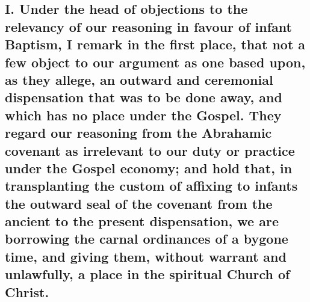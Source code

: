 \documentclass[]{book}
\begin{document}
\hypertarget{i.-under-the-head-of-objections-to-the-relevancy-of-our-reasoning-in-favour-of-infant-baptism-i-remark-in-the-first-place-that-not-a-few-object-to-our-argument-as-one-based-upon-as-they-allege-an-outward-and-ceremonial-dispensation-that-was-to-be-done-away-and-which-has-no-place-under-the-gospel.-they-regard-our-reasoning-from-the-abrahamic-covenant-as-irrelevant-to-our-duty-or-practice-under-the-gospel-economy-and-hold-that-in-transplanting-the-custom-of-affixing-to-infants-the-outward-seal-of-the-covenant-from-the-ancient-to-the-present-dispensation-we-are-borrowing-the-carnal-ordinances-of-a-bygone-time-and-giving-them-without-warrant-and-unlawfully-a-place-in-the-spiritual-church-of-christ.}{%
\subsection{I. Under the head of objections to the relevancy of our reasoning in favour of infant Baptism, I remark in the first place, that not a few object to our argument as one based upon, as they allege, an outward and ceremonial dispensation that was to be done away, and which has no place under the Gospel. They regard our reasoning from the Abrahamic covenant as irrelevant to our duty or practice under the Gospel economy; and hold that, in transplanting the custom of affixing to infants the outward seal of the covenant from the ancient to the present dispensation, we are borrowing the carnal ordinances of a bygone time, and giving them, without warrant and unlawfully, a place in the spiritual Church of Christ.}\label{i.-under-the-head-of-objections-to-the-relevancy-of-our-reasoning-in-favour-of-infant-baptism-i-remark-in-the-first-place-that-not-a-few-object-to-our-argument-as-one-based-upon-as-they-allege-an-outward-and-ceremonial-dispensation-that-was-to-be-done-away-and-which-has-no-place-under-the-gospel.-they-regard-our-reasoning-from-the-abrahamic-covenant-as-irrelevant-to-our-duty-or-practice-under-the-gospel-economy-and-hold-that-in-transplanting-the-custom-of-affixing-to-infants-the-outward-seal-of-the-covenant-from-the-ancient-to-the-present-dispensation-we-are-borrowing-the-carnal-ordinances-of-a-bygone-time-and-giving-them-without-warrant-and-unlawfully-a-place-in-the-spiritual-church-of-christ.}}
\end{document}
